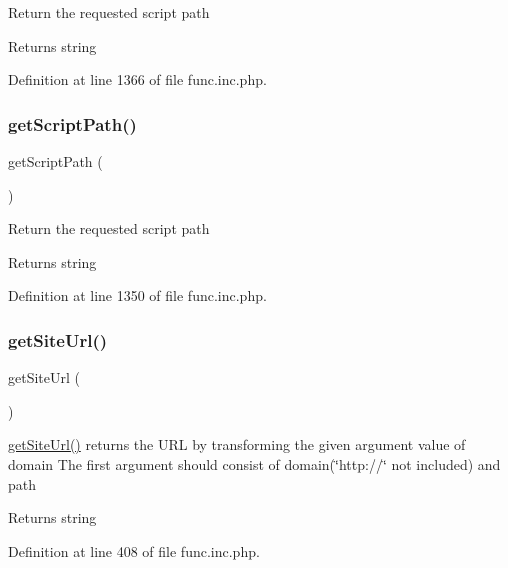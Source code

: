 Return the requested script path

\begin{DoxyReturn}{Returns}
string 
\end{DoxyReturn}


Definition at line 1366 of file func.\+inc.\+php.

\hypertarget{func_8inc_8php_a1086859329d03f8830d51d254c18e47e}{}\label{func_8inc_8php_a1086859329d03f8830d51d254c18e47e} 
\subsubsection{\texorpdfstring{get\+Script\+Path()}{getScriptPath()}}
{\footnotesize\ttfamily get\+Script\+Path (\begin{DoxyParamCaption}{ }\end{DoxyParamCaption})}

Return the requested script path

\begin{DoxyReturn}{Returns}
string 
\end{DoxyReturn}


Definition at line 1350 of file func.\+inc.\+php.

\hypertarget{func_8inc_8php_a2d80ea9652d1586d5dcd03d022150f73}{}\label{func_8inc_8php_a2d80ea9652d1586d5dcd03d022150f73} 
\subsubsection{\texorpdfstring{get\+Site\+Url()}{getSiteUrl()}}
{\footnotesize\ttfamily get\+Site\+Url (\begin{DoxyParamCaption}{ }\end{DoxyParamCaption})}

\hyperlink{func_8inc_8php_a2d80ea9652d1586d5dcd03d022150f73}{get\+Site\+Url()} returns the U\+RL by transforming the given argument value of domain The first argument should consist of domain(\char`\"{}http\+://\char`\"{} not included) and path

\begin{DoxyReturn}{Returns}
string 
\end{DoxyReturn}


Definition at line 408 of file func.\+inc.\+php.

